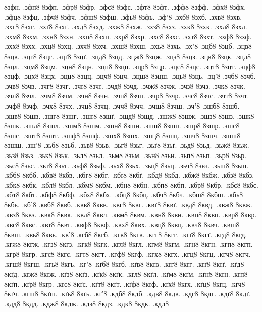 {8зфн.
.зфп8
8зфп.
.зфр8
8зфр.
.зфс8
8зфс.
.зфт8
8зфт.
.зфф8
8зфф.
.зфх8
8зфх.
.зфц8
8зфц.
.зфч8
8зфч.
.зфш8
8зфш.
.зфь8
8зфь.
.зф'8
.зхб8
8зхб.
.зхв8
8зхв.
.зхг8
8зхг.
.зхґ8
8зхґ.
.зхд8
8зхд.
.зхж8
8зхж.
.зхз8
8зхз.
.зхк8
8зхк.
.зхл8
8зхл.
.зхм8
8зхм.
.зхн8
8зхн.
.зхп8
8зхп.
.зхр8
8зхр.
.зхс8
8зхс.
.зхт8
8зхт.
.зхф8
8зхф.
.зхх8
8зхх.
.зхц8
8зхц.
.зхч8
8зхч.
.зхш8
8зхш.
.зхь8
8зхь.
.зх'8
.зцб8
8зцб.
.зцв8
8зцв.
.зцг8
8зцг.
.зцґ8
8зцґ.
.зцд8
8зцд.
.зцж8
8зцж.
.зцз8
8зцз.
.зцк8
8зцк.
.зцл8
8зцл.
.зцм8
8зцм.
.зцн8
8зцн.
.зцп8
8зцп.
.зцр8
8зцр.
.зцс8
8зцс.
.зцт8
8зцт.
.зцф8
8зцф.
.зцх8
8зцх.
.зцц8
8зцц.
.зцч8
8зцч.
.зцш8
8зцш.
.зць8
8зць.
.зц'8
.зчб8
8зчб.
.зчв8
8зчв.
.зчг8
8зчг.
.зчґ8
8зчґ.
.зчд8
8зчд.
.зчж8
8зчж.
.зчз8
8зчз.
.зчк8
8зчк.
.зчл8
8зчл.
.зчм8
8зчм.
.зчн8
8зчн.
.зчп8
8зчп.
.зчр8
8зчр.
.зчс8
8зчс.
.зчт8
8зчт.
.зчф8
8зчф.
.зчх8
8зчх.
.зчц8
8зчц.
.зчч8
8зчч.
.зчш8
8зчш.
.зч'8
.зшб8
8зшб.
.зшв8
8зшв.
.зшг8
8зшг.
.зшґ8
8зшґ.
.зшд8
8зшд.
.зшж8
8зшж.
.зшз8
8зшз.
.зшк8
8зшк.
.зшл8
8зшл.
.зшм8
8зшм.
.зшн8
8зшн.
.зшп8
8зшп.
.зшр8
8зшр.
.зшс8
8зшс.
.зшт8
8зшт.
.зшф8
8зшф.
.зшх8
8зшх.
.зшц8
8зшц.
.зшч8
8зшч.
.зшш8
8зшш.
.зш'8
.зьб8
8зьб.
.зьв8
8зьв.
.зьг8
8зьг.
.зьґ8
8зьґ.
.зьд8
8зьд.
.зьж8
8зьж.
.зьз8
8зьз.
.зьк8
8зьк.
.зьл8
8зьл.
.зьм8
8зьм.
.зьн8
8зьн.
.зьп8
8зьп.
.зьр8
8зьр.
.зьс8
8зьс.
.зьт8
8зьт.
.зьф8
8зьф.
.зьх8
8зьх.
.зьц8
8зьц.
.зьч8
8зьч.
.зьш8
8зьш.
.кбб8
8кбб.
.кбв8
8кбв.
.кбг8
8кбг.
.кбґ8
8кбґ.
.кбд8
8кбд.
.кбж8
8кбж.
.кбз8
8кбз.
.кбк8
8кбк.
.кбл8
8кбл.
.кбм8
8кбм.
.кбн8
8кбн.
.кбп8
8кбп.
.кбр8
8кбр.
.кбс8
8кбс.
.кбт8
8кбт.
.кбф8
8кбф.
.кбх8
8кбх.
.кбц8
8кбц.
.кбч8
8кбч.
.кбш8
8кбш.
.кбь8
8кбь.
.кб'8
.квб8
8квб.
.квв8
8квв.
.квг8
8квг.
.квґ8
8квґ.
.квд8
8квд.
.квж8
8квж.
.квз8
8квз.
.квк8
8квк.
.квл8
8квл.
.квм8
8квм.
.квн8
8квн.
.квп8
8квп.
.квр8
8квр.
.квс8
8квс.
.квт8
8квт.
.квф8
8квф.
.квх8
8квх.
.квц8
8квц.
.квч8
8квч.
.квш8
8квш.
.квь8
8квь.
.кв'8
.кгб8
8кгб.
.кгв8
8кгв.
.кгг8
8кгг.
.кгґ8
8кгґ.
.кгд8
8кгд.
.кгж8
8кгж.
.кгз8
8кгз.
.кгк8
8кгк.
.кгл8
8кгл.
.кгм8
8кгм.
.кгн8
8кгн.
.кгп8
8кгп.
.кгр8
8кгр.
.кгс8
8кгс.
.кгт8
8кгт.
.кгф8
8кгф.
.кгх8
8кгх.
.кгц8
8кгц.
.кгч8
8кгч.
.кгш8
8кгш.
.кгь8
8кгь.
.кг'8
.кґб8
8кґб.
.кґв8
8кґв.
.кґг8
8кґг.
.кґґ8
8кґґ.
.кґд8
8кґд.
.кґж8
8кґж.
.кґз8
8кґз.
.кґк8
8кґк.
.кґл8
8кґл.
.кґм8
8кґм.
.кґн8
8кґн.
.кґп8
8кґп.
.кґр8
8кґр.
.кґс8
8кґс.
.кґт8
8кґт.
.кґф8
8кґф.
.кґх8
8кґх.
.кґц8
8кґц.
.кґч8
8кґч.
.кґш8
8кґш.
.кґь8
8кґь.
.кґ'8
.кдб8
8кдб.
.кдв8
8кдв.
.кдг8
8кдг.
.кдґ8
8кдґ.
.кдд8
8кдд.
.кдж8
8кдж.
.кдз8
8кдз.
.кдк8
8кдк.
.кдл8
}
